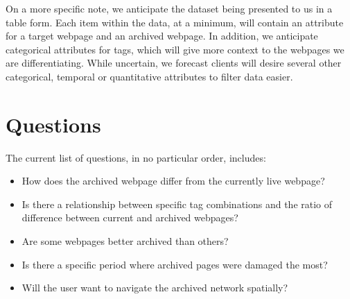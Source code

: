 \documentclass[12pt]{article}
\begin{document}
On a more specific note, we anticipate the dataset being presented to us in a table form. Each item within the data, at a minimum, will contain an attribute for a target webpage and an archived webpage. In addition, we anticipate categorical attributes for tags, which will give more context to the webpages we are differentiating. While uncertain, we forecast clients will desire several other categorical, temporal or quantitative attributes to filter data easier. 

\section*{Questions}
The current list of questions, in no particular order, includes:

\begin{itemize}
  \item How does the archived webpage differ from the currently live webpage?
  \item Is there a relationship between specific tag combinations and the ratio of difference between current and archived webpages?
  \item Are some webpages better archived than others?
  \item Is there a specific period where archived pages were damaged the most?
  \item Will the user want to navigate the archived network spatially?
\end{itemize}

\clearpage
\end{document}
